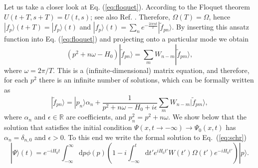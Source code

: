 Let us take a closer look at Eq. (\ref{eq:floquet}). According to the Floquet theorem $U(t+T,s+T)=U(t,s)$; see also Ref. \cite{yajima1977}. Therefore, $\Omega(T)=\Omega$, hence $|f_p\rangle(t+T)=|f_p\rangle(t)$ and $|f_p\rangle(t)=\sum_n e^{-\frac{2 i \pi n  t}{T}} |\tilde f_{pn}\rangle$. By inserting this ansatz function into Eq. (\ref{eq:floquet}) and projecting onto a particular mode we obtain 
\begin{equation}
(p^2+n \omega -H_0)| \tilde  f_{pn}\rangle= \sum_m W_{n-m}|\tilde f_{pm}\rangle,
\label{eq:set}
\end{equation}
where $\omega=2\pi/T$. This is a (infinite-dimensional) matrix equation, and therefore, for each $p^2$ there is an infinite number of solutions, which can be formally written as 
\begin{equation}
|\tilde f_{pn}\rangle = |p_n\rangle \alpha_n + \frac{1}{p^2+n\omega-H_0+ i\epsilon}\sum_{m}W_{n-m}|\tilde f_{pm}\rangle,
\label{eq:tildefpn}
\end{equation}
where $\alpha_n$ and $\epsilon\in\mathbb{R}$ are coefficients, and $p_n^2=p^2+n\omega$. We show below that the solution that satisfies the initial condition $\Psi(x,t\to-\infty)\to \Psi_0(x,t)$ has $\alpha_n=\delta_{n,0}$ and $\epsilon>0$. To this end
we write the formal solution to Eq.~(\ref{eq:schr}) 
\begin{equation}
|\Psi\rangle(t)=e^{-i H_0 t}\int_{-\infty}^{\infty}\mathrm{d}p\phi(p)\left(1-i \int_{-\infty}^t \mathrm{d}t' e^{i H_0 t'}W(t')\Omega(t')e^{-i H_0 t'}\right)|p\rangle.
\label{eq:psi_t}
\end{equation}
